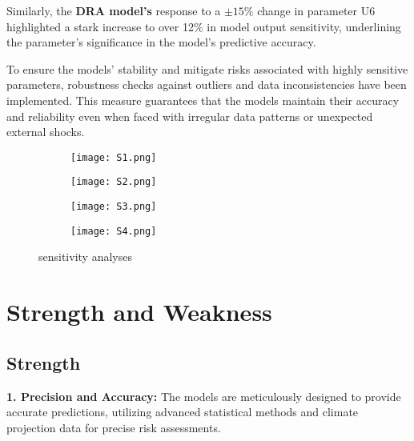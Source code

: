 \documentclass{mcmthesis}
\begin{document}
Similarly, the \textbf{DRA model's} response to a \(\pm15\%\) change in parameter U6 highlighted a stark increase to over 12\% in model output sensitivity, underlining the parameter's significance in the model's predictive accuracy.

To ensure the models' stability and mitigate risks associated with highly sensitive parameters, robustness checks against outliers and data inconsistencies have been implemented. This measure guarantees that the models maintain their accuracy and reliability even when faced with irregular data patterns or unexpected external shocks.

\begin{figure}[h]
    \centering
    \begin{subfigure}{.4\textwidth}
        \centering
        \texttt{[image: S1.png]}
        \label{fig:panmodel}
    \end{subfigure}%
    \begin{subfigure}{.4\textwidth}
        \centering
        \texttt{[image: S2.png]}
        \label{fig:dramodel}
    \end{subfigure}
    \begin{subfigure}{.4\textwidth}
        \centering
        \texttt{[image: S3.png]}
        \label{fig:absdeviation}
    \end{subfigure}
    \begin{subfigure}{.4\textwidth}
        \centering
        \texttt{[image: S4.png]}
        \label{fig:greyanalysis}
    \end{subfigure}
    \caption{sensitivity analyses}
    \label{fig:composite}
\end{figure}

\section{Strength and Weakness}

\subsection{Strength}
\textbf{1. Precision and Accuracy:} The models are meticulously designed to provide accurate predictions, utilizing advanced statistical methods and climate projection data for precise risk assessments.
\end{document}
